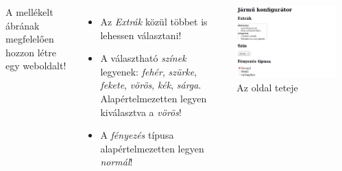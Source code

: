 \begin{frame}
  \begin{columns}[c]
      \scriptsize
      A mellékelt ábrának megfelelően hozzon létre egy weboldalt!
      \begin{itemize}
        \item Az \emph{Extrák} közül többet is lehessen választani!
        \item A választható \emph{színek} legyenek: \emph{fehér}, \emph{szürke}, 
        \emph{fekete}, \emph{vörös}, \emph{kék}, \emph{sárga}. Alapértelmezetten legyen 
        kiválasztva a \emph{vörös}!
        \item A \emph{fényezés} típusa alapértelmezetten legyen 
        \emph{normál}!
      \end{itemize}
      \begin{exampleblock}{\small {}}
        \begin{columns}[T]
            \begin{center}
              \includegraphics[width=\textwidth]{urlap8-1.png}\\
              \tiny Az oldal teteje
            \end{center}
            \begin{center}

\end{center}
\end{columns}
\end{exampleblock}
\end{columns}
\end{frame}
